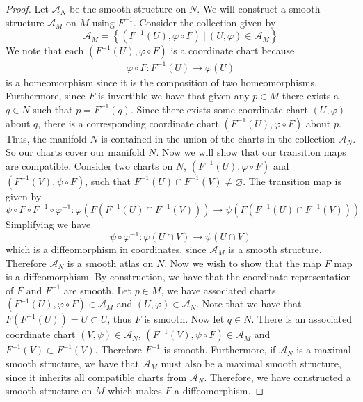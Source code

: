 \documentclass[a4paper]{article}
\begin{document}
\begin{proof}
  Let $\mathcal{A}_N$ be the smooth structure on $N$. We will construct a smooth structure $\mathcal{A}_M$ on $M$ using $F^{-1}$. Consider the collection given by
  \[
    \mathcal{A}_M = \left\{(F^{-1}(U), \varphi \circ F)\ |\  (U, \varphi) \in \mathcal{A}_M \right\}
  \]
  We note that each $(F^{-1}(U), \varphi \circ F)$ is a coordinate chart because
  \[
    \begin{aligned}
      \varphi \circ F: F^{-1}(U) \rightarrow \varphi(U)
    \end{aligned}
  \]
  is a homeomorphism since it is the composition of two homeomorphisms. Furthermore, since $F$ is invertible we have that given any $p \in M$ there exists a $q \in N$ such that $p = F^{-1}(q)$. Since there exists some coordinate chart $(U, \varphi)$ about $q$, there is a corresponding coordinate chart $(F^{-1}(U), \varphi \circ F)$ about $p$. Thus, the manifold $N$ is contained in the union of the charts in the collection $\mathcal{A}_N$. So our charts cover our manifold $N$. Now we will show that our transition maps are compatible. Consider two charts on $N$, $(F^{-1}(U), \varphi \circ F)$ and $(F^{-1}(V), \psi \circ F)$, such that $F^{-1}(U) \cap F^{-1}(V) \neq \varnothing$. The transition map is given by
  \[
    \psi \circ F \circ F^{-1} \circ \varphi^{-1}: \varphi(F(F^{-1}(U) \cap F^{-1}(V))) \rightarrow \psi(F(F^{-1}(U) \cap F^{-1}(V)))
  \]
  Simplifying we have
  \[
    \psi \circ \varphi^{-1}: \varphi(U \cap V) \rightarrow \psi(U \cap V)
  \]
  which is a diffeomorphism in coordinates, since $\mathcal{A}_M$ is a smooth structure. Therefore $\mathcal{A}_N$ is a smooth atlas on $N$. Now we wish to show that the map $F$ map is a diffeomorphism. By construction, we have that the coordinate representation of $F$ and $F^{-1}$ are smooth. Let $p \in M$, we have associated charts  $(F^{-1}(U), \varphi \circ F) \in \mathcal{A}_M$ and $(U, \varphi) \in \mathcal{A}_N$. Note that we have that $F(F^{-1}(U)) = U \subset U$, thus $F$ is smooth. Now let $q \in N$. There is an associated coordinate chart $(V, \psi) \in \mathcal{A}_N$, $(F^{-1}(V), \psi \circ F) \in \mathcal{A}_M$ and $F^{-1}(V) \subset F^{-1}(V)$. Therefore $F^{-1}$ is smooth. Furthermore, if $\mathcal{A}_N$ is a maximal smooth structure, we have that $\mathcal{A}_M$ must also be a maximal smooth structure, since it inherits all compatible charts from $\mathcal{A}_N$. Therefore, we have constructed a smooth structure on $M$ which makes $F$ a diffeomorphism.


\end{proof}
\end{document}
